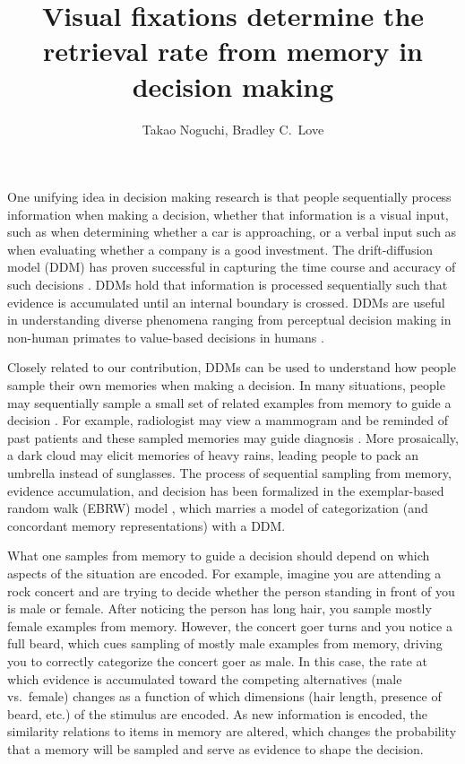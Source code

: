 \documentclass[man,floatsintext]{apa6}
\title{Visual fixations determine the retrieval rate from memory in decision making}
\author{Takao Noguchi, Bradley C.\ Love}
\affiliation{Department of Experimental Psychology, University College London}
\begin{document}
\maketitle

One unifying idea in decision making research is that people sequentially process information when
making a decision, whether that information is a visual input, such as when determining whether a
car is approaching, or a verbal input such as when evaluating whether a company is a good
investment. The drift-diffusion model (DDM) has proven successful in capturing the time course and
accuracy of such decisions \parencite[e.g.,][]{Ratcliff2004a, Bogacz2010a}. DDMs hold that
information is processed sequentially such that evidence is accumulated until an internal boundary
is crossed. DDMs are useful in understanding diverse phenomena ranging from perceptual decision
making in non-human primates \parencite[e.g.,][]{Gold2007a, Kable2009a} to value-based decisions in
humans \parencite[e.g.,][]{Krajbich2010a, Krajbich2011a}.

Closely related to our contribution, DDMs can be used to understand how people sample their own
memories when making a decision. In many situations, people may sequentially sample a small set of
related examples from memory to guide a decision \parencite[e.g.,][]{Vlaev2011a, Giguere2013a,
Tversky1974a}. For example, radiologist may view a mammogram and be reminded of past patients and
these sampled memories may guide diagnosis \parencite{Hornsby2014a}. More prosaically, a dark
cloud may elicit memories of heavy rains, leading people to pack an umbrella instead of sunglasses.
The process of sequential sampling from memory, evidence accumulation, and decision has been
formalized in the exemplar-based random walk (EBRW) model \parencite{Nosofsky1997a}, which marries a
model of categorization (and concordant memory representations) with a DDM\@.

What one samples from memory to guide a decision should depend on which aspects of the situation
are encoded. For example, imagine you are attending a rock concert and are trying to decide whether
the person standing in front of you is male or female. After noticing the person has long hair,
you sample mostly female examples from memory. However, the concert goer turns and you notice a
full beard, which cues sampling of mostly male examples from memory, driving you to correctly
categorize the concert goer as male. In this case, the rate at which evidence is accumulated toward
the competing alternatives (male vs.\ female) changes as a function of which dimensions (hair length,
presence of beard, etc.) of the stimulus are encoded. As new information is encoded, the similarity
relations to items in memory are altered, which changes the probability that a memory will be
sampled and serve as evidence to shape the decision.
\end{document}
